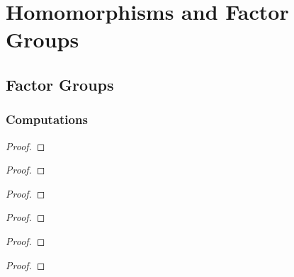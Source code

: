 \newpage
\chapter{Homomorphisms and Factor Groups}

\newpage
\section{Factor Groups}

\subsection*{Computations}

\newpage
\begin{exercise}
\end{exercise}

\begin{proof}
\end{proof}

\newpage
\begin{exercise}
\end{exercise}

\begin{proof}
\end{proof}

\newpage
\begin{exercise}
\end{exercise}

\begin{proof}
\end{proof}

\newpage
\begin{exercise}
\end{exercise}

\begin{proof}
\end{proof}

\newpage
\begin{exercise}
\end{exercise}

\begin{proof}
\end{proof}

\newpage
\begin{exercise}
\end{exercise}

\begin{proof}
\end{proof}

